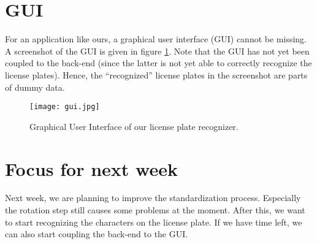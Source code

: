 \documentclass{tudelftposter}
\begin{document}
\section{GUI}
For an application like ours, a graphical user interface (GUI) cannot be missing. A screenshot of the GUI is given in figure \ref{gui}. Note that the GUI has not yet been coupled to the back-end (since the latter is not yet able to correctly recognize the license plates). Hence, the ``recognized'' license plates in the screenshot are parts of dummy data. 

\begin{figure}[h]
	\centering
	\texttt{[image: gui.jpg]}
	\caption{Graphical User Interface of our license plate recognizer.}
	\label{gui}
\end{figure}

\section{Focus for next week}
Next week, we are planning to improve the standardization process. Especially the rotation step still causes some problems at the moment. After this, we want to start recognizing the characters on the license plate. If we have time left, we can also start coupling the back-end to the GUI. 
\end{document}
